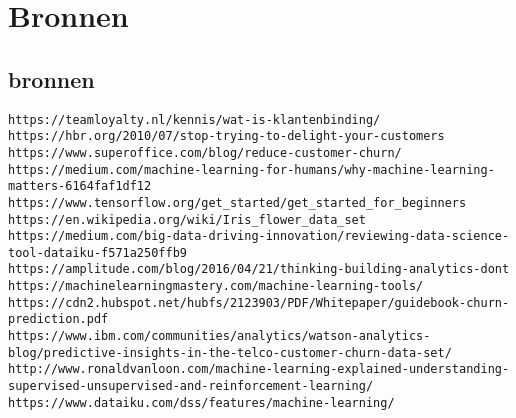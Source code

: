 
\chapter{Bronnen}
\label{ch:Bronnen}


\section{bronnen}

\begin{verbatim}
https://teamloyalty.nl/kennis/wat-is-klantenbinding/ 
https://hbr.org/2010/07/stop-trying-to-delight-your-customers 
https://www.superoffice.com/blog/reduce-customer-churn/ 
https://medium.com/machine-learning-for-humans/why-machine-learning-matters-6164faf1df12 
https://www.tensorflow.org/get_started/get_started_for_beginners https://en.wikipedia.org/wiki/Iris_flower_data_set 
https://medium.com/big-data-driving-innovation/reviewing-data-science-tool-dataiku-f571a250ffb9 https://amplitude.com/blog/2016/04/21/thinking-building-analytics-dont https://machinelearningmastery.com/machine-learning-tools/
https://cdn2.hubspot.net/hubfs/2123903/PDF/Whitepaper/guidebook-churn-prediction.pdf 
https://www.ibm.com/communities/analytics/watson-analytics-blog/predictive-insights-in-the-telco-customer-churn-data-set/ 
http://www.ronaldvanloon.com/machine-learning-explained-understanding-supervised-unsupervised-and-reinforcement-learning/ 
https://www.dataiku.com/dss/features/machine-learning/ 

\end{verbatim}



